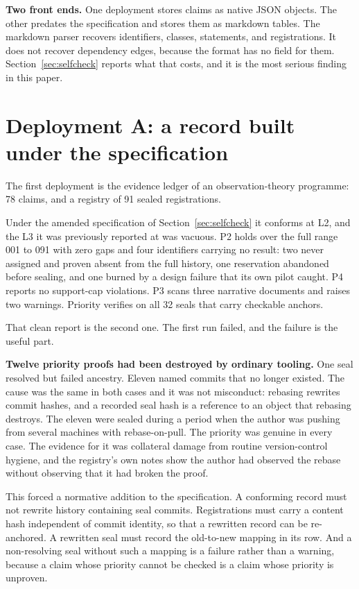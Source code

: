 \documentclass[journal]{IEEEtran}
\begin{document}
\textbf{Two front ends.} One deployment stores claims as native JSON objects.
The other predates the specification and stores them as markdown tables. The
markdown parser recovers identifiers, classes, statements, and registrations.
It does not recover dependency edges, because the format has no field for them.
Section~\ref{sec:selfcheck} reports what that costs, and it is the most serious
finding in this paper.

\section{Deployment A: a record built under the specification}
\label{sec:greenfield}

The first deployment is the evidence ledger of an observation-theory programme:
78 claims, and a registry of 91 sealed registrations.

Under the amended specification of Section~\ref{sec:selfcheck} it conforms at
L2, and the L3 it was previously reported at was vacuous. P2 holds over the full
range 001 to 091 with zero gaps and
four identifiers carrying no result: two never assigned and proven absent from
the full history, one reservation abandoned before sealing, and one burned by a
design failure that its own pilot caught. P4 reports no support-cap violations.
P3 scans three narrative documents and raises two warnings. Priority verifies on
all 32 seals that carry checkable anchors.

That clean report is the second one. The first run failed, and the failure is
the useful part.

\textbf{Twelve priority proofs had been destroyed by ordinary tooling.} One seal
resolved but failed ancestry. Eleven named commits that no longer existed. The
cause was the same in both cases and it was not misconduct: rebasing rewrites
commit hashes, and a recorded seal hash is a reference to an object that rebasing
destroys. The eleven were sealed during a period when the author was pushing from
several machines with rebase-on-pull. The priority was genuine in every case. The
evidence for it was collateral damage from routine version-control hygiene, and
the registry's own notes show the author had observed the rebase without
observing that it had broken the proof.

This forced a normative addition to the specification. A conforming record must
not rewrite history containing seal commits. Registrations must carry a content
hash independent of commit identity, so that a rewritten record can be
re-anchored. A rewritten seal must record the old-to-new mapping in its row. And
a non-resolving seal without such a mapping is a failure rather than a warning,
because a claim whose priority cannot be checked is a claim whose priority is
unproven.
\end{document}
